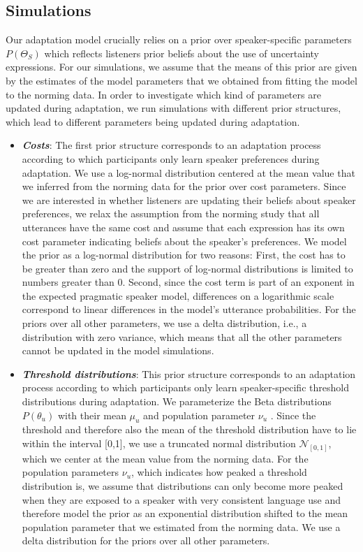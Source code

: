 \documentclass[lucida,biblatex]{sp} %
\begin{document}
\subsection{Simulations}

Our adaptation model crucially relies on a prior over speaker-specific parameters $P(\Theta_S)$
which reflects listeners prior beliefs about the use of uncertainty expressions. For our simulations,
we assume that the means of this prior are given by the estimates of the model parameters that 
we obtained from fitting the model to the norming data.
In order to investigate which kind of parameters are updated during adaptation, we run simulations
with different prior structures, which lead to different parameters being updated during adaptation.

\begin{itemize}
\item \textbf{\textit{Costs}}: The first prior structure corresponds to an adaptation process according to which participants only learn speaker preferences during adaptation. 
We use a log-normal distribution centered at the mean value that we inferred from the norming data for the prior over cost parameters. Since we are interested in whether listeners are updating their beliefs about speaker preferences, we relax the assumption from the norming study that all utterances have the same cost and assume that each expression has its own cost parameter indicating beliefs about the speaker's preferences. We model the prior as a log-normal distribution for two reasons: First, the cost has to be greater than zero and the support of log-normal distributions is limited to numbers greater than 0. Second, since the cost term is part of an exponent in the expected pragmatic speaker model, differences on a logarithmic scale correspond to linear differences in the model's utterance probabilities. For the priors over all other parameters, we use a delta distribution, i.e., a distribution with zero variance, which means that all the other parameters cannot be updated in the model simulations.
\item \textbf{\textit{Threshold distributions}}:  This prior structure corresponds to an adaptation process according to which participants only learn speaker-specific threshold distributions during adaptation. We parameterize the Beta distributions $P(\theta_u)$ with their mean $\mu_u$ and population parameter $\nu_u$ \citep{Kruschke2014}. Since the threshold and therefore also the mean of the threshold distribution have to lie within the interval [0,1], we use a truncated normal distribution $\mathscr{N}_{[0,1]}$, which we center at the mean value from the norming data. For the population parameters $\nu_u$, which indicates how peaked a threshold distribution is, we assume that distributions can only become more peaked when they are exposed to a speaker with very consistent language use and therefore model the prior as an exponential distribution shifted to the mean population parameter that we estimated from the norming data. We use a delta distribution for the priors over all other parameters.

\end{itemize}
\end{document}
